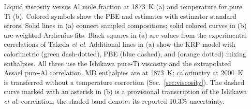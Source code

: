 \caption{Liquid viscosity versus Al mole fraction at 1873~K (a) and temperature for pure Ti (b). Colored symbols show the PBE and \rscan{} estimates with estimator standard errors. Solid lines in (a) connect sampled compositions; solid colored curves in (b) are weighted Arrhenius fits. Black squares in (a) are values from the experimental correlations of Takeda \textit{et al.}\cite{Takeda2025} Additional lines in (a) show the KRP model with calorimetric (green dash-dotted), PBE (blue dashed), and \rscan{} (orange dotted) mixing enthalpies. All three use the Ishikawa pure-Ti viscosity and the extrapolated Assael pure-Al correlation.\cite{Assael2006} MD enthalpies are at 1873~K; calorimetry at 2000~K is transferred without a temperature correction (Sec.~\ref{sec:viscosity}). The dashed curve marked with an asterisk in (b) is a provisional transcription of the Ishikawa \textit{et al.}\cite{Ishikawa2012} correlation; the shaded band denotes its reported 10.3\% uncertainty.}
